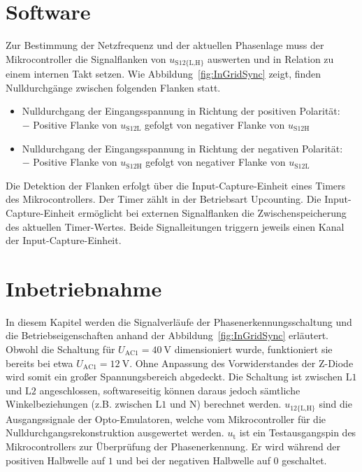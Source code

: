 \documentclass[a4paper,12pt]{article}
\begin{document}
\section{Software}
\label{sec:SwGridFrequency}
Zur Bestimmung der Netzfrequenz und der aktuellen Phasenlage muss der Mikrocontroller die Signalflanken von $u_\text{S12\{L,H\}}$ auswerten und in Relation zu einem internen Takt setzen. Wie Abbildung~\ref{fig:InGridSync} zeigt, finden Nulldurchgänge zwischen folgenden Flanken statt.
\begin{itemize}
    \item Nulldurchgang der Eingangsspannung in Richtung der positiven Polarität:\\
    $-$ Positive Flanke von $u_\text{S12L}$ gefolgt von negativer Flanke von $u_\text{S12H}$
    \item Nulldurchgang der Eingangsspannung in Richtung der negativen Polarität:\\
    $-$ Positive Flanke von $u_\text{S12H}$ gefolgt von negativer Flanke von $u_\text{S12L}$
\end{itemize}

Die Detektion der Flanken erfolgt über die Input-Capture-Einheit eines Timers des Mikrocontrollers. Der Timer zählt in der Betriebsart Upcounting. Die Input-Capture-Einheit ermöglicht bei externen Signalflanken die Zwischenspeicherung des aktuellen Timer-Wertes. Beide Signalleitungen triggern jeweils einen Kanal der Input-Capture-Einheit.


\section{Inbetriebnahme}
In diesem Kapitel werden die Signalverläufe der Phasenerkennungsschaltung und die Betriebseigenschaften anhand der Abbildung~\ref{fig:InGridSync} erläutert. Obwohl die Schaltung für $U_\text{AC1} = 40~\text{V}$ dimensioniert wurde, funktioniert sie bereits bei etwa $U_\text{AC1} = 12~\text{V}$. Ohne Anpassung des Vorwiderstandes der Z-Diode wird somit ein großer Spannungsbereich abgedeckt. Die Schaltung ist zwischen $\text{L1}$ und $\text{L2}$ angeschlossen, softwareseitig können daraus jedoch sämtliche Winkelbeziehungen (z.B. zwischen $\text{L1}$ und $\text{N}$) berechnet werden. $u_\text{12\{L,H\}}$ sind die Ausgangssignale der Opto-Emulatoren, welche vom Mikrocontroller für die Nulldurchgangsrekonstruktion ausgewertet werden. $u_\text{t}$ ist ein Testausgangspin des Mikrocontrollers zur Überprüfung der Phasenerkennung. Er wird während der positiven Halbwelle auf $1$ und bei der negativen Halbwelle auf $0$ geschaltet. 
\end{document}

